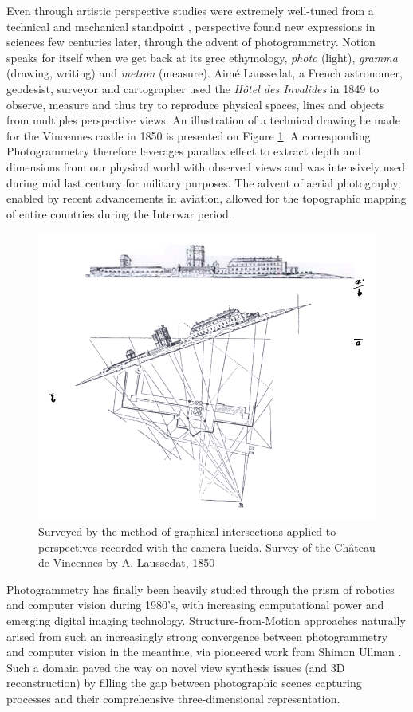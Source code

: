 Even through artistic perspective studies were extremely well-tuned from a technical and mechanical standpoint \citep{simon2021jan}, perspective found new expressions in sciences few centuries later, through the advent of photogrammetry. Notion speaks for itself when we get back at its grec ethymology, \textit{photo} (\ie light), \textit{gramma} (\ie drawing, writing) and \textit{metron} (\ie measure). Aimé Laussedat, a French astronomer, geodesist, surveyor and cartographer used the \textit{Hôtel des Invalides} in 1849 to observe, measure and thus try to reproduce physical spaces, lines and objects from multiples perspective views. An illustration of a technical drawing he made for the Vincennes castle in 1850 is presented on Figure \ref{fig:intro_laussedat}. A corresponding  Photogrammetry therefore leverages parallax effect to extract depth and dimensions from our physical world with observed views and was intensively used during mid last century for military purposes. The advent of aerial photography, enabled by recent advancements in aviation, allowed for the topographic mapping of entire countries during the Interwar period.

\begin{figure}[h!]
      \begin{center}
      \includegraphics[width=.5\textwidth]{images/introduction/laussedat_phtograpmetrie.png}
      \end{center}
      \caption{Surveyed by the method of graphical intersections applied to perspectives recorded with the camera lucida. Survey of the Château de Vincennes by A. Laussedat, 1850}
      \label{fig:intro_laussedat}
\end{figure}

Photogrammetry has finally been heavily studied through the prism of robotics and computer vision during 1980's, with increasing computational power and emerging digital imaging technology. Structure-from-Motion approaches naturally arised from such an increasingly strong convergence between photogrammetry and computer vision in the meantime, via pioneered work from Shimon Ullman \citep{ullman1979interpretation}. Such a domain paved the way on novel view synthesis issues (and 3D reconstruction) by filling the gap between photographic scenes capturing processes and their comprehensive three-dimensional representation. 


